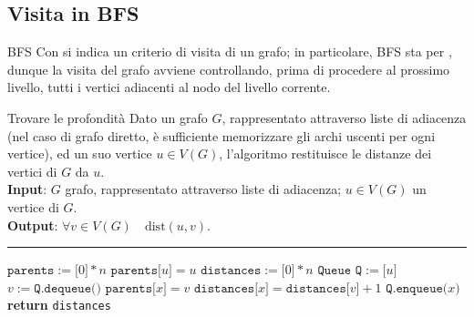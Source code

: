 \documentclass[a4paper, 12pt]{report}
\begin{document}
    \subsection{Visita in BFS}

    \begin{frameddefn}{BFS}
        Con  si indica un criterio di visita di un grafo; in particolare, BFS sta per , dunque la visita del grafo avviene controllando, prima di procedere al prossimo livello, tutti i vertici adiacenti al nodo del livello corrente.
    \end{frameddefn}

    \begin{framedalgo}[label={bfs}]{Trovare le profondità}
        Dato un grafo $G$, rappresentato attraverso liste di adiacenza (nel caso di grafo diretto, è sufficiente memorizzare gli archi uscenti per ogni vertice), ed un suo vertice $u \in V(G)$, l'algoritmo restituisce le distanze dei vertici di $G$ da $u$.\\
        \textbf{Input}: $G$ grafo, rappresentato attraverso liste di adiacenza; $u \in V(G)$ un vertice di $G$.\\
        \textbf{Output}: $\forall v \in V(G) \quad \mathrm{dist}(u, v)$.

        \hrule
        \begin{algorithmic}[1]
                \State $\texttt{parents}:=\texttt{[}0\texttt{]} * n$
                \State $\texttt{parents[}u\texttt{]} = u$
                \State $\texttt{distances}:=\texttt{[}0\texttt{]} * n$
                \State $\texttt{Queue Q} := \texttt{[}u\texttt{]}$
                    \State $v := \texttt{Q.dequeue()}$
                        \State $\texttt{parents[}x\texttt{]} = v$
                        \State $\texttt{distances[}x\texttt{]}=\texttt{distances[}v\texttt{]} + 1$
                        \State $\texttt{Q.enqueue(}x\texttt{)}$
                    \EndIf
                    \EndFor
                \EndWhile
                \State \textbf{return} \texttt{distances}
            \EndFunction
        \end{algorithmic}
    \end{framedalgo}
\end{document}
